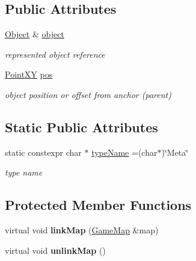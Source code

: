 \subsection*{Public Attributes}
\begin{DoxyCompactItemize}
\item 
\hypertarget{classObjectMapMeta_a7c63160bc0d55ce0dfa9819a5796e027}{}\hyperlink{classObject}{Object} \& \hyperlink{classObjectMapMeta_a7c63160bc0d55ce0dfa9819a5796e027}{object}\label{classObjectMapMeta_a7c63160bc0d55ce0dfa9819a5796e027}

\begin{DoxyCompactList}\small\item\em represented object reference \end{DoxyCompactList}\item 
\hypertarget{classObjectMapMeta_a7ca5609abb6c5fd57fe3828725240847}{}\hyperlink{classPointXY}{Point\+X\+Y} \hyperlink{classObjectMapMeta_a7ca5609abb6c5fd57fe3828725240847}{pos}\label{classObjectMapMeta_a7ca5609abb6c5fd57fe3828725240847}

\begin{DoxyCompactList}\small\item\em object position or offset from anchor (parent) \end{DoxyCompactList}\end{DoxyCompactItemize}
\subsection*{Static Public Attributes}
\begin{DoxyCompactItemize}
\item 
\hypertarget{classObjectMapMeta_a65628ecfd0b0db1e2e2534d2ed93a59b}{}static constexpr char $\ast$ \hyperlink{classObjectMapMeta_a65628ecfd0b0db1e2e2534d2ed93a59b}{type\+Name} =(char$\ast$)\char`\"{}Meta\char`\"{}\label{classObjectMapMeta_a65628ecfd0b0db1e2e2534d2ed93a59b}

\begin{DoxyCompactList}\small\item\em type name \end{DoxyCompactList}\end{DoxyCompactItemize}
\subsection*{Protected Member Functions}
\begin{DoxyCompactItemize}
\item 
\hypertarget{classObjectMapMeta_a80a10a6a51b8533c24f5106d3be695d5}{}virtual void {\bfseries link\+Map} (\hyperlink{classGameMap}{Game\+Map} \&map)\label{classObjectMapMeta_a80a10a6a51b8533c24f5106d3be695d5}

\item 
\hypertarget{classObjectMapMeta_a3b256fc24b4c5262443094634a91330c}{}virtual void {\bfseries unlink\+Map} ()\label{classObjectMapMeta_a3b256fc24b4c5262443094634a91330c}

\end{DoxyCompactItemize}
